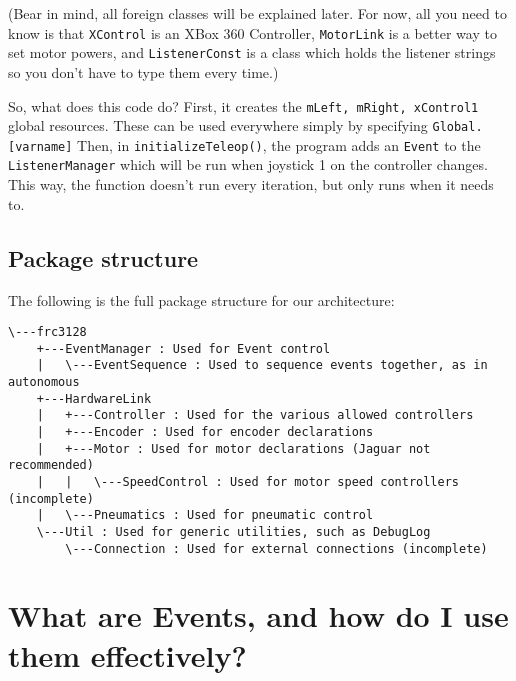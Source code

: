 \documentclass[a4paper]{article}
\begin{document}
(Bear in mind, all foreign classes will be explained later. For now, all you need to know is that \lstinline{XControl} is an XBox 360 Controller, \lstinline{MotorLink} is a better way to set motor powers, and \lstinline{ListenerConst} is a class which holds the listener strings so you don't have to type them every time.)

So, what does this code do? First, it creates the \lstinline{mLeft, mRight, xControl1} global resources. These can be used everywhere simply by specifying \lstinline{Global.[varname]} Then, in \lstinline{initializeTeleop()}, the program adds an \lstinline{Event} to the \lstinline{ListenerManager} which will be run when joystick 1 on the controller changes. This way, the function doesn't run every iteration, but only runs when it needs to.

\subsection{Package structure}
The following is the full package structure for our architecture:
\begin{lstlisting}
\---frc3128
    +---EventManager : Used for Event control
    |   \---EventSequence : Used to sequence events together, as in autonomous
    +---HardwareLink
    |   +---Controller : Used for the various allowed controllers
    |   +---Encoder : Used for encoder declarations
    |   +---Motor : Used for motor declarations (Jaguar not recommended)
    |   |   \---SpeedControl : Used for motor speed controllers (incomplete)
    |   \---Pneumatics : Used for pneumatic control
    \---Util : Used for generic utilities, such as DebugLog
        \---Connection : Used for external connections (incomplete)
\end{lstlisting}


\section{What are Events, and how do I use them effectively?}
\end{document}
